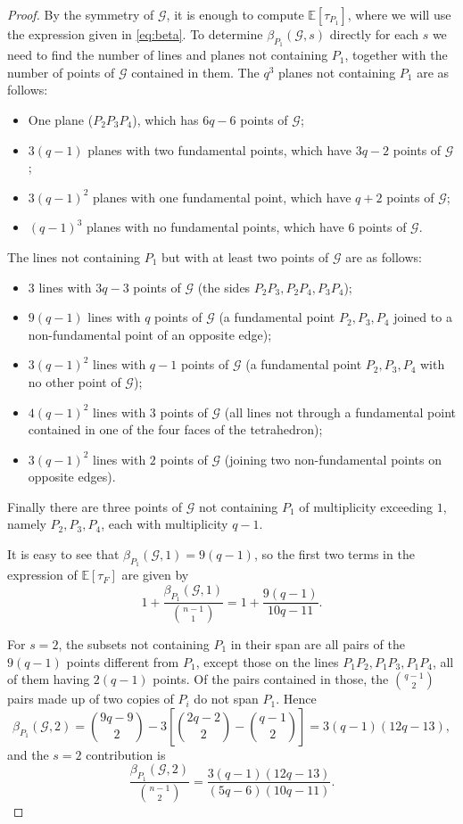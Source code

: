 \documentclass{article}
\newcommand{\Gscr}{\mathscr{G}}
\newcommand{\E}{\mathbb{E}}
\begin{document}
\begin{proof}
By the symmetry of $\Gscr$, it is enough to compute $\E[\tau_{P_1}]$, where we will use the expression given in \eqref{eq:beta}. To determine $\beta_{P_1}(\Gscr,s)$
directly for each $s$ we need to find the number of lines and planes not containing $P_1$, together with the number of points of $\Gscr$ contained in them.  The $q^3$ planes not containing $P_1$ are as follows:
\begin{itemize}
    \item One plane ($P_2P_3P_4$), which has $6q-6$ points of $\Gscr$;
    \item $3(q-1)$ planes with two fundamental points, which have $3q-2$ points of $\Gscr$;
    \item $3(q-1)^2$ planes with one fundamental point, which have $q+2$ points of $\Gscr$;
    \item $(q-1)^3$ planes with no fundamental points, which have $6$ points of $\Gscr$.
\end{itemize}

The lines not containing $P_1$ but with at least two points of $\Gscr$ are as follows:
\begin{itemize}
    \item $3$ lines with $3q-3$ points of $\Gscr$ (the sides $P_2P_3,P_2P_4,P_3P_4$);
    \item $9(q-1)$ lines with $q$ points of $\Gscr$ (a fundamental point $P_2,P_3,P_4$ joined
    to a non-fundamental point of an opposite edge);
    \item $3(q-1)^2$ lines with $q-1$ points of $\Gscr$ (a fundamental point $P_2,P_3,P_4$ with
    no other point of $\Gscr$);
    \item $4(q-1)^2$ lines with $3$ points of $\Gscr$ (all lines not through a fundamental point
    contained in one of the four faces of the tetrahedron);
    \item $3(q-1)^2$ lines with $2$ points of $\Gscr$ (joining two non-fundamental points on
    opposite edges).
\end{itemize}
Finally there are three points of $\Gscr$ not containing $P_1$ of multiplicity exceeding $1$,
namely $P_2,P_3,P_4$, each with multiplicity $q-1$.

It is easy to see that $\beta_{P_1}(\Gscr,1)=9(q-1)$, so the first two terms in the expression of $\E[\tau_F]$ are given by 
\[
1+\frac{\beta_{P_1}(\Gscr,1)}{\binom{n-1}{1}}
=1+\frac{9(q-1)}{10q-11}.
\]

For $s=2$, the subsets not containing $P_1$ in their span are all pairs of the $9(q-1)$ points different from $P_1$, except those on the lines $P_1P_2,P_1P_3,P_1P_4$, all of them having $2(q-1)$ points. Of the pairs contained in those, the $\binom{q-1}{2}$ pairs made up of two copies of $P_i$ do not span $P_1$. Hence
\[
\beta_{P_1}(\Gscr,2)
=\binom{9q-9}{2}-3\!\left[\binom{2q-2}{2}-\binom{q-1}{2}\right]
=3(q-1)(12q-13),
\]
and the $s=2$ contribution is
\[
\frac{\beta_{P_1}(\Gscr,2)}{\binom{n-1}{2}}
=\frac{3(q-1)(12q-13)}{(5q-6)(10q-11)} .
\]


\end{proof}
\end{document}
